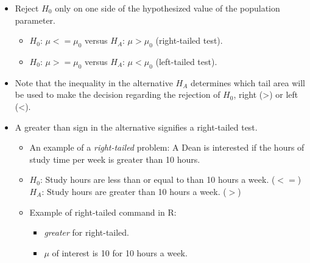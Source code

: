 \documentclass[
  letterpaper,
  DIV=11,
  numbers=noendperiod]{scrreprt}
\newenvironment{Shaded}{\begin{snugshade}}{\end{snugshade}}
\newcommand{\AttributeTok}[1]{\textcolor[rgb]{0.40,0.45,0.13}{#1}}
\newcommand{\DecValTok}[1]{\textcolor[rgb]{0.68,0.00,0.00}{#1}}
\newcommand{\FunctionTok}[1]{\textcolor[rgb]{0.28,0.35,0.67}{#1}}
\newcommand{\NormalTok}[1]{\textcolor[rgb]{0.00,0.23,0.31}{#1}}
\newcommand{\OtherTok}[1]{\textcolor[rgb]{0.00,0.23,0.31}{#1}}
\newcommand{\SpecialCharTok}[1]{\textcolor[rgb]{0.37,0.37,0.37}{#1}}
\newcommand{\StringTok}[1]{\textcolor[rgb]{0.13,0.47,0.30}{#1}}
\providecommand{\tightlist}{%
  \setlength{\itemsep}{0pt}\setlength{\parskip}{0pt}}\usepackage{longtable,booktabs,array}
\begin{document}
\begin{itemize}
\item
  Reject \(H_0\) only on one side of the hypothesized value of the
  population parameter.

  \begin{itemize}
  \tightlist
  \item
    \(H_0\): \(\mu <=\mu_0\) versus \(H_A\): \(\mu > \mu_0\)
    (right-tailed test).
  \item
    \(H_0\): \(\mu >=\mu_0\) versus \(H_A\): \(\mu < \mu_0\)
    (left-tailed test).
  \end{itemize}
\item
  Note that the inequality in the alternative \(H_A\) determines which
  tail area will be used to make the decision regarding the rejection of
  \(H_0\), right (\textgreater) or left (\textless).
\item
  A greater than sign in the alternative signifies a right-tailed test.

  \begin{itemize}
  \item
    An example of a \emph{right-tailed} problem: A Dean is interested if
    the hours of study time per week is greater than 10 hours.
  \item
    \(H_0\): Study hours are less than or equal to than 10 hours a week.
    (\(<=\)) \(H_A\): Study hours are greater than 10 hours a week.
    (\(>\))
  \item
    Example of right-tailed command in R:

    \begin{itemize}
    \tightlist
    \item
      \emph{greater} for right-tailed.
    \item
      \(\mu\) of interest is 10 for 10 hours a week.
    \end{itemize}
  \end{itemize}
\end{itemize}

\begin{Shaded}
\end{Shaded}
\end{document}
